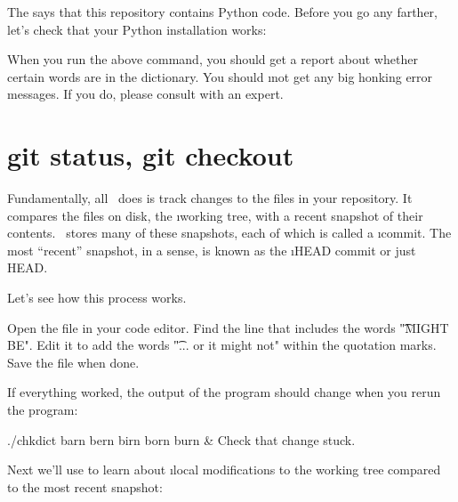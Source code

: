 \documentclass[letterpaper, 12pt, titlepage, twoside]{article}
\begin{document}

The  says that this repository contains Python code. Before you go
any farther, let's check that your Python installation works:


When you run the above command, you should get a report about whether certain
words are in the dictionary. You should \i{not} get any big honking error
messages. If you do, please consult with an expert.

\vspace{3em}

\section{git status, git checkout}


Fundamentally, all \git\ does is track changes to the files in your
repository. It compares the files on disk, the \i{working tree}, with a recent
snapshot of their contents. \git\ stores many of these snapshots, each of
which is called a \i{commit}. The most ``recent'' snapshot, in a \x sense, is
known as the \i{HEAD} commit or just HEAD.

\vspace{2em}


Let's see how this process works.

\x
\begin{noncli}
  Open the file  in your code editor. Find the line that includes
  the words \t{"MIGHT BE"}. Edit it to add the words \t{"... or it might not"}
  within the quotation marks. Save the file when done.
\end{noncli}

If everything worked, the output of the program should change when you rerun
the program:

\begin{typeme}
./chkdict barn bern birn born burn & Check that change stuck.
\end{typeme}

Next we'll use  to learn about \i{local modifications} to the
working tree compared to the most recent snapshot:
\end{document}
